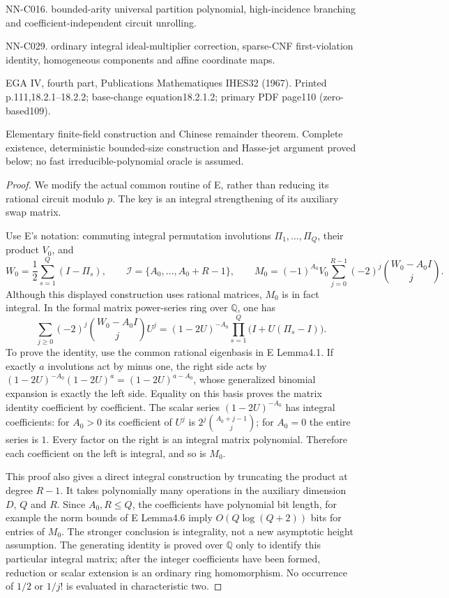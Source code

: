 NN-C016. bounded-arity universal partition polynomial, high-incidence branching and coefficient-independent circuit unrolling.

NN-C029. ordinary integral ideal-multiplier correction, sparse-CNF first-violation identity, homogeneous components and affine coordinate maps.

EGA IV, fourth part, Publications Mathematiques IHES32 (1967). Printed p.111,18.2.1--18.2.2; base-change equation18.2.1.2; primary PDF page110 (zero-based109).

Elementary finite-field construction and Chinese remainder theorem. Complete existence, deterministic bounded-size construction and Hasse-jet argument proved below; no fast irreducible-polynomial oracle is assumed.

\begin{proof}
We modify the actual common routine of E, rather than reducing its rational circuit modulo $p$. The key is an integral strengthening of its auxiliary swap matrix.

Use E's notation: commuting integral permutation involutions $\Pi_1,\ldots,\Pi_Q$, their product $V_0$, and
\[
 W_0=\frac12\sum_{s=1}^Q(I-\Pi_s),\qquad
 \mathcal I=\{A_0,\ldots,A_0+R-1\},\qquad
 M_0=(-1)^{A_0}V_0\sum_{j=0}^{R-1}
                      (-2)^j\binom{W_0-A_0I}{j}.
\]
Although this displayed construction uses rational matrices, $M_0$ is in fact integral. In the formal matrix power-series ring over $\mathbb Q$, one has
\begin{equation}\label{eq:C033-integral-generating}
 \sum_{j\geq0}(-2)^j\binom{W_0-A_0I}{j}U^j
       =(1-2U)^{-A_0}\prod_{s=1}^Q\bigl(I+U(\Pi_s-I)\bigr).
\end{equation}
To prove the identity, use the common rational eigenbasis in E Lemma4.1. If exactly $a$ involutions act by minus one, the right side acts by
$(1-2U)^{-A_0}(1-2U)^a=(1-2U)^{a-A_0}$, whose generalized binomial expansion is exactly the left side. Equality on this basis proves the matrix identity coefficient by coefficient. The scalar series $(1-2U)^{-A_0}$ has integral coefficients: for $A_0>0$ its coefficient of $U^j$ is $2^j\binom{A_0+j-1}{j}$; for $A_0=0$ the entire series is $1$. Every factor on the right is an integral matrix polynomial. Therefore each coefficient on the left is integral, and so is $M_0$.

This proof also gives a direct integral construction by truncating the product at degree $R-1$. It takes polynomially many operations in the auxiliary dimension $D$, $Q$ and $R$. Since $A_0,R\leq Q$, the coefficients have polynomial bit length, for example the norm bounds of E Lemma4.6 imply $O(Q\log(Q+2))$ bits for entries of $M_0$. The stronger conclusion is integrality, not a new asymptotic height assumption. The generating identity is proved over $\mathbb Q$ only to identify this particular integral matrix; after the integer coefficients have been formed, reduction or scalar extension is an ordinary ring homomorphism. No occurrence of $1/2$ or $1/j!$ is evaluated in characteristic two.


\end{proof}
